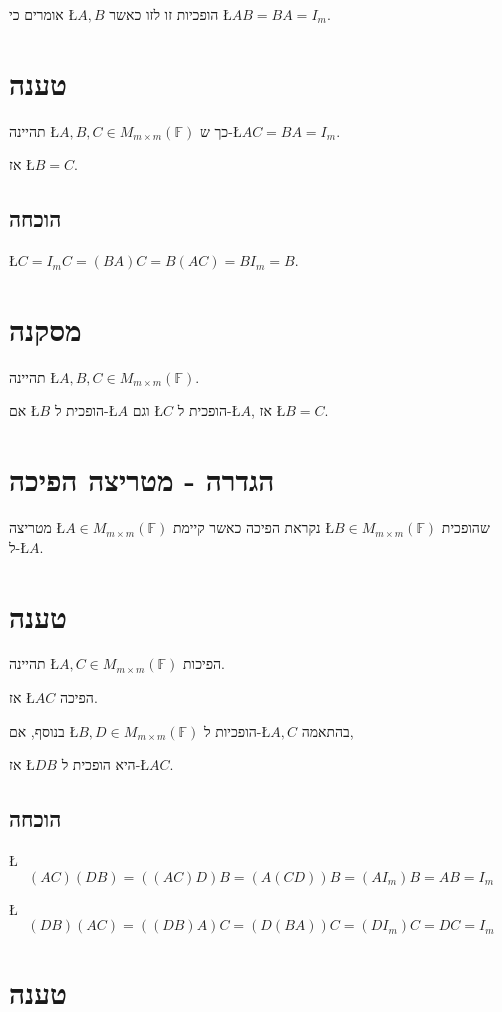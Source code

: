 \documentclass[english,hebrew]{article}
\begin{document}
אומרים כי \L{$A,B$} הופכיות זו לזו כאשר \L{$AB=BA=I_{m}$}.

\section{טענה}

תהיינה \L{$A,B,C\in M_{m\times m}(\mathbb{F})$} כך ש-\L{$AC=BA=I_{m}$}.

אז \L{$B=C$}.

\subsection{הוכחה}

\L{$C=I_{m}C=(BA)C=B(AC)=BI_{m}=B$}.

\section{מסקנה}

תהיינה \L{$A,B,C\in M_{m\times m}(\mathbb{F})$}.

אם \L{$B$} הופכית ל-\L{$A$} וגם \L{$C$} הופכית ל-\L{$A$}, אז \L{$B=C$}.

\section{הגדרה - מטריצה הפיכה}

מטריצה \L{$A\in M_{m\times m}(\mathbb{F})$} נקראת הפיכה כאשר קיימת
\L{$B\in M_{m\times m}(\mathbb{F})$} שהופכית ל-\L{$A$}.

\section{טענה}

תהיינה \L{$A,C\in M_{m\times m}(\mathbb{F})$} הפיכות.

אז \L{$AC$} הפיכה.

בנוסף, אם \L{$B,D\in M_{m\times m}(\mathbb{F})$} הופכיות ל-\L{$A,C$}
בהתאמה,

אז \L{$DB$} היא הופכית ל-\L{$AC$}.

\subsection{הוכחה}

\L{%
\[
(AC)(DB)=((AC)D)B=(A(CD))B=(AI_{m})B=AB=I_{m}
\]
}%

\L{%
\[
(DB)(AC)=((DB)A)C=(D(BA))C=(DI_{m})C=DC=I_{m}
\]
}%

\section{טענה}
\end{document}
